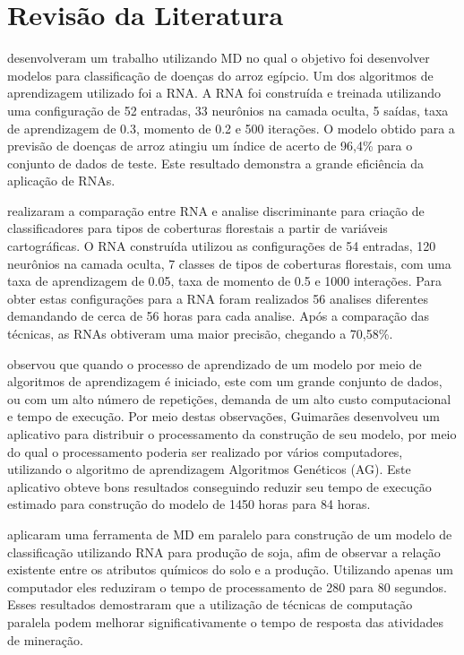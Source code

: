 \chapter{Revisão da Literatura}
 desenvolveram um trabalho utilizando MD no qual o objetivo foi desenvolver modelos para classificação de doenças do arroz egípcio. Um dos algoritmos de aprendizagem utilizado foi a RNA. A RNA foi construída e treinada utilizando uma configuração de 52 entradas, 33 neurônios na camada oculta, 5 saídas, taxa de aprendizagem de 0.3, momento de 0.2 e 500 iterações. O modelo obtido para a previsão de doenças de arroz atingiu um índice de acerto de 96,4\% para o conjunto de dados de teste. Este resultado demonstra a grande eficiência da aplicação de RNAs.

 realizaram a comparação entre RNA e analise discriminante para criação de classificadores para tipos de coberturas florestais a partir de variáveis cartográficas. O RNA construída utilizou as configurações de 54 entradas, 120 neurônios na camada oculta, 7 classes de tipos de coberturas florestais, com uma taxa de aprendizagem de 0.05, taxa de momento de 0.5 e 1000 interações. Para obter estas configurações para a RNA foram realizados 56 analises diferentes demandando de cerca de 56 horas para cada analise. Após a comparação das técnicas, as RNAs obtiveram uma maior precisão, chegando a 70,58\%.

 observou que quando o processo de aprendizado de um modelo por meio de algoritmos de aprendizagem é iniciado, este com um grande conjunto de dados, ou com um alto número de repetições, demanda de um alto custo computacional e tempo de execução. Por meio destas observações, Guimarães desenvolveu um aplicativo para distribuir o processamento da construção de seu modelo, por meio do qual o processamento poderia ser realizado por vários computadores, utilizando o algoritmo de aprendizagem Algoritmos Genéticos (AG). Este aplicativo obteve bons resultados conseguindo reduzir seu tempo de execução estimado para construção do modelo de 1450 horas para 84 horas.

 aplicaram uma ferramenta de MD em paralelo para construção de um modelo de classificação utilizando RNA para produção de soja, afim de observar a relação existente entre os atributos químicos do solo e a produção. Utilizando apenas um computador eles reduziram o tempo de processamento de 280 para 80 segundos. Esses resultados demostraram que a utilização de técnicas de computação paralela podem melhorar significativamente o tempo de resposta das atividades de mineração.

